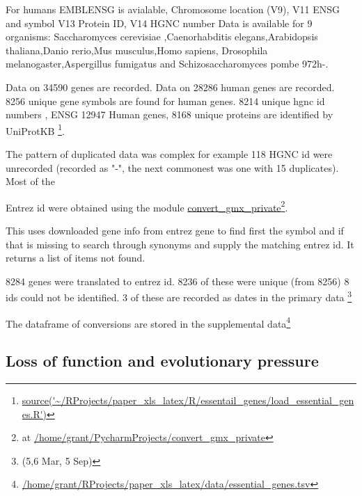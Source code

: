   For humans EMBLENSG is avialable, Chromosome location (V9), V11 ENSG and symbol V13 Protein ID, V14 HGNC number
 Data is available for 9 organisms:  Saccharomyces cerevisiae   ,Caenorhabditis elegans,Arabidopsis thaliana,Danio rerio,Mus musculus,Homo sapiens,
 Drosophila melanogaster,Aspergillus fumigatus and Schizosaccharomyces pombe 972h-.
 
 Data on 34590 genes are recorded. 
 Data on 28286  human genes are recorded. 8256 unique gene symbols are found for human genes. 8214 unique hgnc id numbers  , ENSG 12947 Human genes, 8168 unique proteins  are identified by UniProtKB  \footnote{\url{source('~/RProjects/paper_xls_latex/R/essentail_genes/load_essential_genes.R')}}.
 
 The pattern of duplicated data was complex for example 118 HGNC id were unrecorded (recorded as "-", the next commonest was one with 15 duplicates). Most of the 
 
 Entrez id were obtained using the module \url{convert_gmx_private}\footnote{ at \url{/home/grant/PycharmProjects/convert_gmx_private}}.
 
 This uses downloaded gene info from entrez gene to find first the symbol and if that is missing to search through synonyms and supply the matching entrez id. It returns a list of items not found. 
 
8284 genes were translated to entrez id. 8236 of these were unique (from 8256) 8 ids could not be identified. 3 of these are recorded as dates in the primary data \footnote{(5,6 Mar, 5 Sep)}
 
 The dataframe of conversions are stored in the supplemental data\footnote{ \url{/home/grant/RProjects/paper_xls_latex/data/essential_genes.tsv}}
\subsection{Loss of function and evolutionary pressure}

